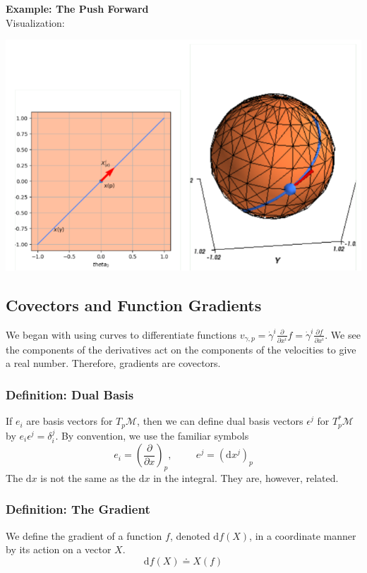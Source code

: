 \documentclass[10pt]{article}
\begin{document}
\textbf{Example: The Push Forward}\\
Visualization:
\begin{center}
    \includegraphics*[scale=0.8]{W6_3.png}
\end{center}

\subsection*{Covectors and Function Gradients}
We began with using curves to differentiate functions $v_{\gamma, p} = \dot{\gamma}^i \frac{\partial}{\partial x^i}f = \dot{\gamma}^i \frac{\partial f}{\partial x^i}$.  We see the components of the derivatives act on the components of the velocities to give a real number.  Therefore, gradients are covectors.

\subsubsection*{Definition: Dual Basis}
If $e_i$ are basis vectors for $T_p \mathcal{M}$, then we can define dual basis vectors $\epsilon^j$ for $T_p^* \mathcal{M}$ by $e_i \epsilon^j = \delta_i^j$.  By convention, we use the familiar symbols
\[e_i = \left(\frac{\partial}{\partial x}\right)_p, \hspace{1cm} e^j = (\text{d}x^j)_p\]
The $\text{d}x$ is not the same as the $\text{d}x$ in the integral. They are, however, related.

\subsubsection*{Definition: The Gradient}
We define the gradient of a function $f$, denoted $\text{d}f(X)$, in a coordinate manner by its action on a vector $X$.
\[\text{d}f(X) \doteq X(f)\]
\end{document}
